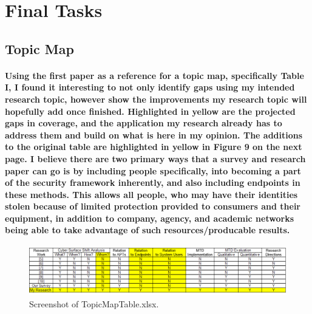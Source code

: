 \documentclass{article}
\begin{document}
\section{Final Tasks}
    \subsection{Topic Map}
        \paragraph{Using the first paper \cite{sengupta_survey_2020} as a reference for a topic map, specifically Table I, I found it interesting to not only identify gaps using my intended research topic, however show the improvements my research topic will hopefully add once finished. Highlighted in yellow are the projected gaps in coverage, and the application my research already has to address them and build on what is here in my opinion. The additions to the original table are highlighted in yellow in Figure 9 on the next page. I believe there are two primary ways that a survey and research paper can go is by including people specifically, into becoming a part of the security framework inherently, and also including endpoints in these methods. This allows all people, who may have their identities stolen because of limited protection provided to consumers and their equipment, in addition to company, agency, and academic networks being able to take advantage of such resources/producable results.}
        \clearpage
            \begin{figure}[ht!] %
            \centering
            \caption{\label{fig:TableOfContentsSnippet.png}Screenshot of TopicMapTable.xlsx.}
            \includegraphics[width=1.3938\textwidth, height=0.5\textwidth]{2023-09-11 22 17 33.png}
            \end{figure}
        
\end{document}
